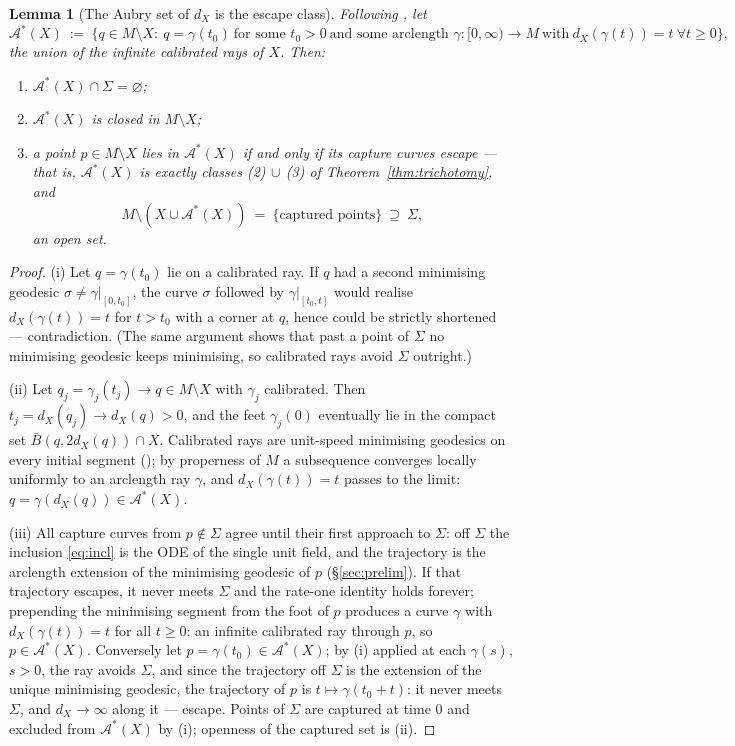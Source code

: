 \documentclass[11pt]{article}
\newtheorem{lemma}[theorem]{Lemma}
\theoremstyle{remark}
\newcommand{\X}{X}
\newcommand{\dX}{d_{\X}}
\newcommand{\Aub}{\mathcal{A}^{\ast}}
\begin{document}
\begin{lemma}[The Aubry set of $\dX$ is the escape class]
\label{lem:aubry}
Following \cite[Def.~1.4]{CCF}, let
\[
  \Aub(\X)\ :=\ \bigl\{q\in M\setminus\X:\ q=\gamma(t_{0})\
  \text{for some } t_{0}>0\ \text{and some arclength }
  \gamma:[0,\infty)\to M\ \text{with}\ \dX(\gamma(t))=t\ \forall
  t\ge0\bigr\},
\]
the union of the infinite calibrated rays of $\X$. Then:
\begin{enumerate}[label=\textup{(\roman*)}]
\item $\Aub(\X)\cap\Sigma=\varnothing$;
\item $\Aub(\X)$ is closed in $M\setminus\X$;
\item a point $p\in M\setminus\X$ lies in $\Aub(\X)$ if and only if
its capture curves escape --- that is, $\Aub(\X)$ is exactly classes
\textup{(2)}$\,\cup\,$\textup{(3)} of
Theorem~\ref{thm:trichotomy}, and
\[
  M\setminus(\X\cup\Aub(\X))\ =\ \{\text{captured points}\}\
  \supseteq\ \Sigma ,
\]
an open set.
\end{enumerate}
\end{lemma}

\begin{proof}
(i) Let $q=\gamma(t_{0})$ lie on a calibrated ray. If $q$ had a
second minimising geodesic $\sigma\neq\gamma|_{[0,t_{0}]}$, the
curve $\sigma$ followed by $\gamma|_{[t_{0},t]}$ would realise
$\dX(\gamma(t))=t$ for $t>t_{0}$ with a corner at $q$, hence could
be strictly shortened --- contradiction. (The same argument shows
that past a point of $\Sigma$ no minimising geodesic keeps
minimising, so calibrated rays avoid $\Sigma$ outright.)

(ii) Let $q_{j}=\gamma_{j}(t_{j})\to q\in M\setminus\X$ with
$\gamma_{j}$ calibrated. Then $t_{j}=\dX(q_{j})\to\dX(q)>0$, and
the feet $\gamma_{j}(0)$ eventually lie in the compact set
$\bar B(q,2\dX(q))\cap\X$. Calibrated rays are unit-speed
minimising geodesics on every initial segment
(\cite[Rem.~1.5]{CCF}); by properness of $M$ a subsequence
converges locally uniformly to an arclength ray $\gamma$, and
$\dX(\gamma(t))=t$ passes to the limit: $q=\gamma(\dX(q))\in
\Aub(\X)$.

(iii) All capture curves from $p\notin\Sigma$ agree until their
first approach to $\Sigma$: off $\Sigma$ the inclusion
\eqref{eq:incl} is the ODE of the single unit field, and the
trajectory is the arclength extension of the minimising geodesic of
$p$ (\S\ref{sec:prelim}). If that trajectory escapes, it never
meets $\Sigma$ and the rate-one identity holds forever; prepending
the minimising segment from the foot of $p$ produces a curve
$\gamma$ with $\dX(\gamma(t))=t$ for all $t\ge0$: an infinite
calibrated ray through $p$, so $p\in\Aub(\X)$. Conversely let
$p=\gamma(t_{0})\in\Aub(\X)$; by (i) applied at each $\gamma(s)$,
$s>0$, the ray avoids $\Sigma$, and since the trajectory off
$\Sigma$ is the extension of the unique minimising geodesic, the
trajectory of $p$ is $t\mapsto\gamma(t_{0}+t)$: it never meets
$\Sigma$, and $\dX\to\infty$ along it --- escape. Points of
$\Sigma$ are captured at time $0$ and excluded from $\Aub(\X)$ by
(i); openness of the captured set is (ii).
\end{proof}
\end{document}
